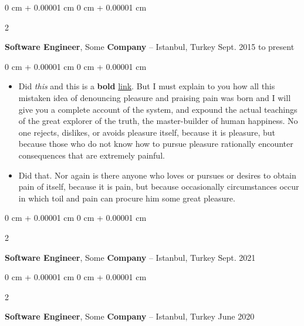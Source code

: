 \documentclass[10pt, letterpaper]{article}
\newenvironment{highlights}{
    \begin{itemize}[
        topsep=0.10 cm,
        parsep=0.10 cm,
        partopsep=0pt,
        itemsep=0pt,
        leftmargin=0 cm + 10pt
    ]
}{
    \end{itemize}
} %
\newenvironment{onecolentry}{
    \begin{adjustwidth}{
        0 cm + 0.00001 cm
    }{
        0 cm + 0.00001 cm
    }
}{
    \end{adjustwidth}
} %
\newenvironment{twocolentry}[2][]{
    \onecolentry
    \def\secondColumn{#2}
    \setcolumnwidth{\fill, 4.5 cm}
    \begin{paracol}{2}
}{
    \switchcolumn \raggedleft \secondColumn
    \end{paracol}
    \endonecolentry
} %
\begin{document}
        \begin{twocolentry}{
            Sept. 2015 to present
        }
            \textbf{Software Engineer}, Some \textbf{Company} -- Istanbul, Turkey\end{twocolentry}

        \vspace{0.10 cm}
        \begin{onecolentry}
            \begin{highlights}
                \item Did \textit{this} and this is a \textbf{bold} \href{https://example.com}{link}. But I must explain to you how all this mistaken idea of denouncing pleasure and praising pain was born and I will give you a complete account of the system, and expound the actual teachings of the great explorer of the truth, the master-builder of human happiness. No one rejects, dislikes, or avoids pleasure itself, because it is pleasure, but because those who do not know how to pursue pleasure rationally encounter consequences that are extremely painful.
                \item Did that. Nor again is there anyone who loves or pursues or desires to obtain pain of itself, because it is pain, but because occasionally circumstances occur in which toil and pain can procure him some great pleasure.
            \end{highlights}
        \end{onecolentry}


        \vspace{0.2 cm}

        \begin{twocolentry}{
            Sept. 2021
        }
            \textbf{Software Engineer}, Some \textbf{Company} -- Istanbul, Turkey\end{twocolentry}



        \vspace{0.2 cm}

        \begin{twocolentry}{
            June 2020
        }
            \textbf{Software Engineer}, Some \textbf{Company} -- Istanbul, Turkey\end{twocolentry}
\end{document}
